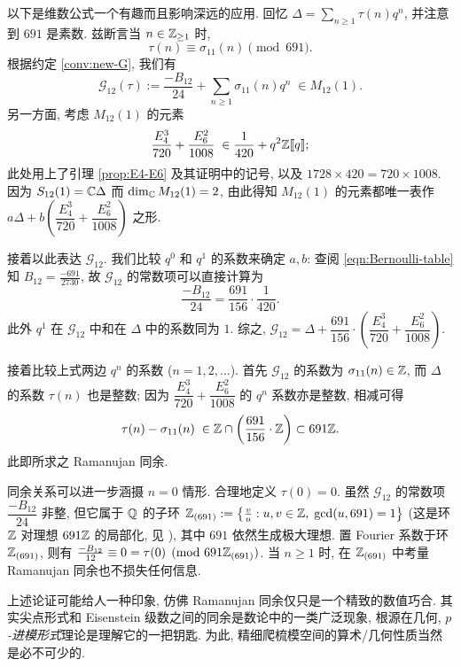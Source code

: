 \begin{example}[Ramanujan 同余]  
	以下是维数公式一个有趣而且影响深远的应用. 回忆 $\Delta = \sum_{n \geq 1} \tau(n) q^n$, 并注意到 $691$ 是素数. 兹断言当 $n \in \mathbb{Z}_{\geq 1}$ 时,
	\[ \tau(n) \equiv \sigma_{11}(n) \pmod {691}. \]
	根据约定 \ref{conv:new-G}, 我们有
	\[ \mathcal{G}_{12}(\tau) := \dfrac{-B_{12}}{24} + \sum_{n \geq 1} \sigma_{11}(n) q^n \; \in M_{12}(1). \]
	另一方面, 考虑 $M_{12}(1)$ 的元素
	\[ \dfrac{E_4^3}{720} + \dfrac{E_6^2}{1008} \;\in \frac{1}{420} + q^2 \mathbb{Z}\llbracket q\rrbracket; \]
	此处用上了引理 \ref{prop:E4-E6} 及其证明中的记号, 以及 $1728 \times 420 = 720 \times 1008$. 因为 $S_{12}(1) = \mathbb{C}\Delta$ 而 $\dim_{\mathbb{C}} M_{12}(1) = 2$, 由此得知 $M_{12}(1)$ 的元素都唯一表作 $a \Delta + b\left(\dfrac{E_4^3}{720} + \dfrac{E_6^2}{1008}\right)$ 之形.
	
	接着以此表达 $\mathcal{G}_{12}$. 我们比较 $q^0$ 和 $q^1$ 的系数来确定 $a,b$: 查阅 \eqref{eqn:Bernoulli-table} 知 $B_{12} = \frac{-691}{2730}$, 故 $\mathcal{G}_{12}$ 的常数项可以直接计算为
	\[ \dfrac{-B_{12}}{24} = \dfrac{691}{156} \cdot \dfrac{1}{420}. \]
	此外 $q^1$ 在 $\mathcal{G}_{12}$ 中和在 $\Delta$ 中的系数同为 $1$. 综之, $\mathcal{G}_{12} = \Delta + \dfrac{691}{156} \cdot \left(\dfrac{E_4^3}{720} + \dfrac{E_6^2}{1008}\right)$.
	
	接着比较上式两边 $q^n$ 的系数 ($n=1,2,\ldots$). 首先 $\mathcal{G}_{12}$ 的系数为 $\sigma_{11}(n) \in \mathbb{Z}$, 而 $\Delta$ 的系数 $\tau(n)$ 也是整数; 因为 $\dfrac{E_4^3}{720} + \dfrac{E_6^2}{1008}$ 的 $q^n$ 系数亦是整数, 相减可得
	\[ \tau(n) - \sigma_{11}(n) \; \in \mathbb{Z} \cap \left(\dfrac{691}{156} \cdot \mathbb{Z}\right) \subset 691\mathbb{Z}. \]
	此即所求之 Ramanujan 同余.
	
	同余关系可以进一步涵摄 $n=0$ 情形. 合理地定义 $\tau(0)=0$. 虽然 $\mathcal{G}_{12}$ 的常数项 $\dfrac{-B_{12}}{24}$ 非整, 但它属于 $\mathbb{Q}$ 的子环 $\mathbb{Z}_{(691)} := \left\{ \frac{v}{u} : u,v \in \mathbb{Z}, \; \text{gcd}(u, 691)=1 \right\}$ (这是环 $\mathbb{Z}$ 对理想 $691 \mathbb{Z}$ 的局部化, 见 \cite[\S 5.3]{Li1}), 其中 $691$ 依然生成极大理想. 置 Fourier 系数于环 $\mathbb{Z}_{(691)}$, 则有 $\frac{-B_{12}}{12} \equiv 0 = \tau(0) \pmod{ 691\mathbb{Z}_{(691)}}$. 当 $n \geq 1$ 时, 在 $\mathbb{Z}_{(691)}$ 中考量 Ramanujan 同余也不损失任何信息.
\end{example}

上述论证可能给人一种印象, 仿佛 Ramanujan 同余仅只是一个精致的数值巧合. 其实尖点形式和 Eisenstein 级数之间的同余是数论中的一类广泛现象, 根源在几何, \emph{$p$-进模形式}理论是理解它的一把钥匙. 为此, 精细爬梳模空间的算术/几何性质当然是必不可少的.

